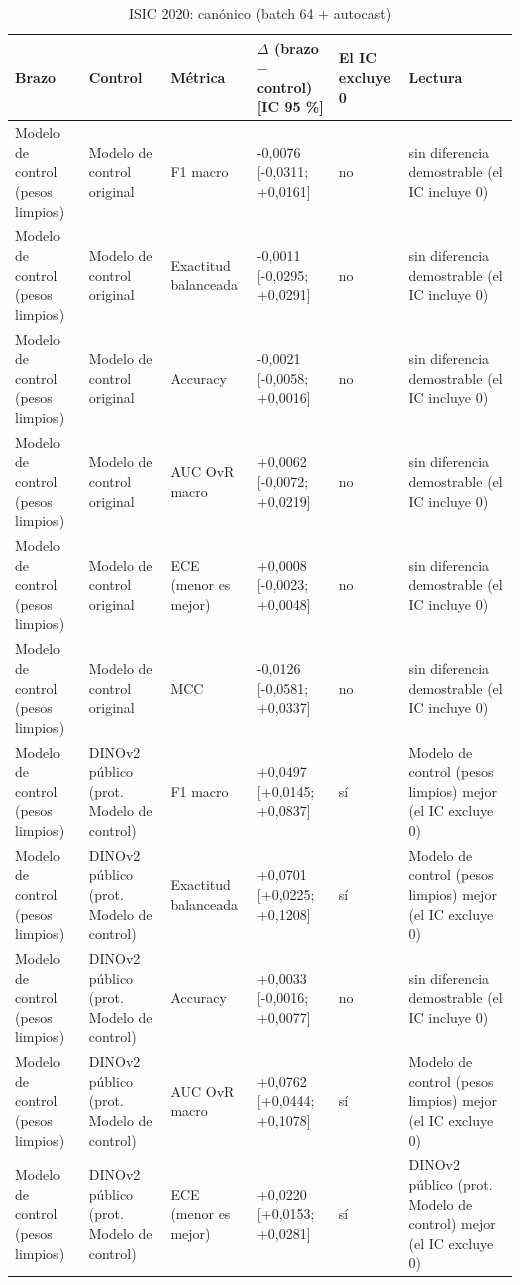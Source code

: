 \begingroup\scriptsize
\begin{longtable}{@{}llllll@{}}
\caption{ISIC 2020: canónico (batch 64 + autocast)}\label{tab:contrast-isic2020-canon} \\
\toprule
Brazo & Control & Métrica & $\Delta$ (brazo $-$ control) [IC 95 \%] & El IC excluye 0 & Lectura \\
\midrule
Modelo de control (pesos limpios) & Modelo de control original & F1 macro & -0,0076 [-0,0311; +0,0161] & no & sin diferencia demostrable (el IC incluye 0) \\
Modelo de control (pesos limpios) & Modelo de control original & Exactitud balanceada & -0,0011 [-0,0295; +0,0291] & no & sin diferencia demostrable (el IC incluye 0) \\
Modelo de control (pesos limpios) & Modelo de control original & Accuracy & -0,0021 [-0,0058; +0,0016] & no & sin diferencia demostrable (el IC incluye 0) \\
Modelo de control (pesos limpios) & Modelo de control original & AUC OvR macro & +0,0062 [-0,0072; +0,0219] & no & sin diferencia demostrable (el IC incluye 0) \\
Modelo de control (pesos limpios) & Modelo de control original & ECE (menor es mejor) & +0,0008 [-0,0023; +0,0048] & no & sin diferencia demostrable (el IC incluye 0) \\
Modelo de control (pesos limpios) & Modelo de control original & MCC & -0,0126 [-0,0581; +0,0337] & no & sin diferencia demostrable (el IC incluye 0) \\
Modelo de control (pesos limpios) & DINOv2 público (prot. Modelo de control) & F1 macro & +0,0497 [+0,0145; +0,0837] & sí & Modelo de control (pesos limpios) mejor (el IC excluye 0) \\
Modelo de control (pesos limpios) & DINOv2 público (prot. Modelo de control) & Exactitud balanceada & +0,0701 [+0,0225; +0,1208] & sí & Modelo de control (pesos limpios) mejor (el IC excluye 0) \\
Modelo de control (pesos limpios) & DINOv2 público (prot. Modelo de control) & Accuracy & +0,0033 [-0,0016; +0,0077] & no & sin diferencia demostrable (el IC incluye 0) \\
Modelo de control (pesos limpios) & DINOv2 público (prot. Modelo de control) & AUC OvR macro & +0,0762 [+0,0444; +0,1078] & sí & Modelo de control (pesos limpios) mejor (el IC excluye 0) \\
Modelo de control (pesos limpios) & DINOv2 público (prot. Modelo de control) & ECE (menor es mejor) & +0,0220 [+0,0153; +0,0281] & sí & DINOv2 público (prot. Modelo de control) mejor (el IC excluye 0) \\

\end{longtable}
